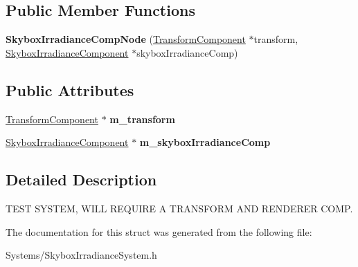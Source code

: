\subsection*{Public Member Functions}
\begin{DoxyCompactItemize}
\item 
\mbox{\label{structSkyboxIrradianceCompNode_a4ffb8ae2b0fc4fe165f34878da0ad2d0}} 
{\bfseries Skybox\+Irradiance\+Comp\+Node} (\hyperlink{classTransformComponent}{Transform\+Component} $\ast$transform, \hyperlink{classSkyboxIrradianceComponent}{Skybox\+Irradiance\+Component} $\ast$skybox\+Irradiance\+Comp)
\end{DoxyCompactItemize}
\subsection*{Public Attributes}
\begin{DoxyCompactItemize}
\item 
\mbox{\label{structSkyboxIrradianceCompNode_a6649aa6fa9e312949c474d9b1963bf3d}} 
\hyperlink{classTransformComponent}{Transform\+Component} $\ast$ {\bfseries m\+\_\+transform}
\item 
\mbox{\label{structSkyboxIrradianceCompNode_a7dd7a371ad548994aa6fd5f408f4c1f3}} 
\hyperlink{classSkyboxIrradianceComponent}{Skybox\+Irradiance\+Component} $\ast$ {\bfseries m\+\_\+skybox\+Irradiance\+Comp}
\end{DoxyCompactItemize}


\subsection{Detailed Description}
T\+E\+ST S\+Y\+S\+T\+EM, W\+I\+LL R\+E\+Q\+U\+I\+RE A T\+R\+A\+N\+S\+F\+O\+RM A\+ND R\+E\+N\+D\+E\+R\+ER C\+O\+MP. 

The documentation for this struct was generated from the following file\+:\begin{DoxyCompactItemize}
\item 
Systems/Skybox\+Irradiance\+System.\+h\end{DoxyCompactItemize}
